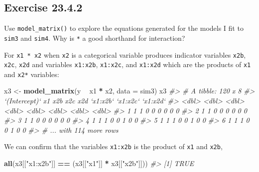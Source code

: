 \documentclass[]{book}
\newenvironment{Shaded}{\begin{snugshade}}{\end{snugshade}}
\newcommand{\CommentTok}[1]{\textcolor[rgb]{0.56,0.35,0.01}{\textit{#1}}}
\newcommand{\DataTypeTok}[1]{\textcolor[rgb]{0.13,0.29,0.53}{#1}}
\newcommand{\KeywordTok}[1]{\textcolor[rgb]{0.13,0.29,0.53}{\textbf{#1}}}
\newcommand{\NormalTok}[1]{#1}
\newcommand{\OperatorTok}[1]{\textcolor[rgb]{0.81,0.36,0.00}{\textbf{#1}}}
\newcommand{\StringTok}[1]{\textcolor[rgb]{0.31,0.60,0.02}{#1}}
\theoremstyle{plain}
\theoremstyle{remark}
\begin{document}
\hypertarget{exercise-23.4.2}{%
\subsection*{\texorpdfstring{Exercise
{23.4.2}}{Exercise 23.4.2}}\label{exercise-23.4.2}}

Use \texttt{model\_matrix()} to explore the equations generated for the
models I fit to \texttt{sim3} and \texttt{sim4}. Why is \texttt{*} a
good shorthand for interaction?

For \texttt{x1\ *\ x2} when \texttt{x2} is a categorical variable
produces indicator variables \texttt{x2b}, \texttt{x2c}, \texttt{x2d}
and variables \texttt{x1:x2b}, \texttt{x1:x2c}, and \texttt{x1:x2d}
which are the products of \texttt{x1} and \texttt{x2*} variables:

\begin{Shaded}
\begin{Highlighting}[]
\NormalTok{x3 <-}\StringTok{ }\KeywordTok{model_matrix}\NormalTok{(y }\OperatorTok{~}\StringTok{ }\NormalTok{x1 }\OperatorTok{*}\StringTok{ }\NormalTok{x2, }\DataTypeTok{data =}\NormalTok{ sim3)}
\NormalTok{x3}
\CommentTok{#> # A tibble: 120 x 8}
\CommentTok{#>   `(Intercept)`    x1   x2b   x2c   x2d `x1:x2b` `x1:x2c` `x1:x2d`}
\CommentTok{#>           <dbl> <dbl> <dbl> <dbl> <dbl>    <dbl>    <dbl>    <dbl>}
\CommentTok{#> 1             1     1     0     0     0        0        0        0}
\CommentTok{#> 2             1     1     0     0     0        0        0        0}
\CommentTok{#> 3             1     1     0     0     0        0        0        0}
\CommentTok{#> 4             1     1     1     0     0        1        0        0}
\CommentTok{#> 5             1     1     1     0     0        1        0        0}
\CommentTok{#> 6             1     1     1     0     0        1        0        0}
\CommentTok{#> # ... with 114 more rows}
\end{Highlighting}
\end{Shaded}

We can confirm that the variables \texttt{x1:x2b} is the product of
\texttt{x1} and \texttt{x2b},

\begin{Shaded}
\begin{Highlighting}[]
\KeywordTok{all}\NormalTok{(x3[[}\StringTok{"x1:x2b"}\NormalTok{]] }\OperatorTok{==}\StringTok{ }\NormalTok{(x3[[}\StringTok{"x1"}\NormalTok{]] }\OperatorTok{*}\StringTok{ }\NormalTok{x3[[}\StringTok{"x2b"}\NormalTok{]]))}
\CommentTok{#> [1] TRUE}
\end{Highlighting}
\end{Shaded}
\end{document}
